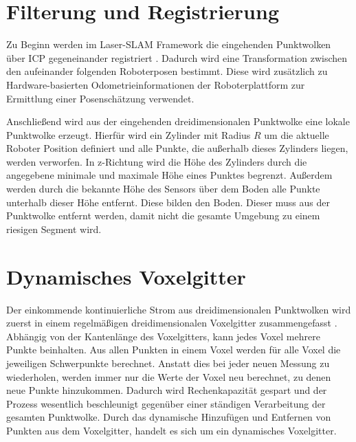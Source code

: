 %
%

\section[Filterung und Registrierung (Schmelzer)]{Filterung und Registrierung}
\label{sec:Filterung}

Zu Beginn werden im Laser-SLAM Framework die eingehenden Punktwolken über ICP gegeneinander registriert \cite{Dube2018}. Dadurch wird eine Transformation zwischen den aufeinander folgenden Roboterposen bestimmt. Diese wird zusätzlich zu Hardware-basierten  Odometrieinformationen der Roboterplattform zur Ermittlung einer Posenschätzung verwendet.  

Anschließend wird aus der eingehenden dreidimensionalen Punktwolke eine lokale Punktwolke erzeugt. Hierfür wird ein Zylinder mit Radius $ R $ um die aktuelle Roboter Position definiert und alle Punkte, die außerhalb dieses Zylinders liegen, werden verworfen.  In z-Richtung wird die Höhe des Zylinders durch die angegebene minimale und maximale Höhe eines Punktes begrenzt. Außerdem werden durch die bekannte Höhe des Sensors über dem Boden alle Punkte unterhalb dieser Höhe entfernt. Diese bilden den Boden. Dieser muss aus der Punktwolke entfernt werden, damit nicht die gesamte Umgebung zu einem riesigen Segment wird. 

\section[Dynamisches Voxelgitter (Schmelzer)]{Dynamisches Voxelgitter}
\label{sec:DVG}

Der einkommende kontinuierliche Strom aus dreidimensionalen Punktwolken wird zuerst in einem regelmäßigen dreidimensionalen Voxelgitter zusammengefasst \cite{Dube2018}. Abhängig von der Kantenlänge des Voxelgitters, kann jedes Voxel mehrere Punkte beinhalten. Aus allen Punkten in einem Voxel werden für alle Voxel die jeweiligen Schwerpunkte berechnet. Anstatt dies bei jeder neuen Messung zu wiederholen, werden immer nur die Werte der Voxel neu berechnet, zu denen neue Punkte hinzukommen. Dadurch wird Rechenkapazität gespart und der Prozess wesentlich beschleunigt gegenüber einer ständigen Verarbeitung der gesamten Punktwolke. Durch das dynamische Hinzufügen und Entfernen von Punkten aus dem Voxelgitter, handelt es sich um ein dynamisches Voxelgitter. 

